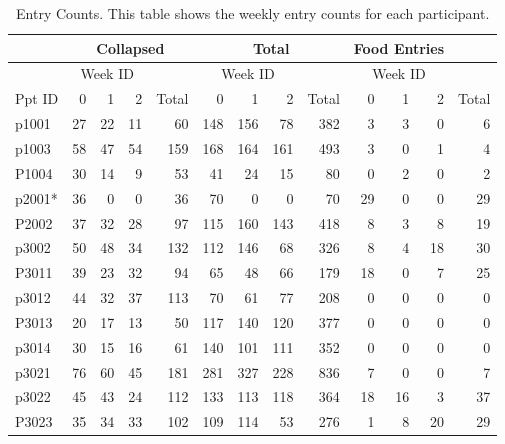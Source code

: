\begin{table}[htbp]
\small
  \centering
  \caption[Entry Counts. ]{Entry Counts. This table shows the weekly entry counts for each participant. }
    \begin{tabular}{lrrrrrrrrrrrr}
    \toprule
          & \multicolumn{4}{c}{Collapsed} & \multicolumn{4}{c}{Total}     & \multicolumn{3}{c}{Food Entries} &  \\
    \midrule
          & \multicolumn{3}{c}{Week ID} & \multicolumn{1}{c}{} & \multicolumn{3}{c}{Week ID} & \multicolumn{1}{c}{} & \multicolumn{3}{c}{Week ID} &  \\
    Ppt ID & 0     & 1     & 2     & Total & 0     & 1     & 2     & Total & 0     & 1     & 2     & Total \\
    p1001 & 27    & 22    & 11    & 60    & 148   & 156   & 78    & 382   & 3     & 3     & 0     & 6 \\
    p1003 & 58    & 47    & 54    & 159   & 168   & 164   & 161   & 493   & 3     & 0     & 1     & 4 \\
    P1004 & 30    & 14    & 9     & 53    & 41    & 24    & 15    & 80    & 0     & 2     & 0     & 2 \\
    p2001* & 36    & 0     & 0     & 36    & 70    & 0     & 0     & 70    & 29    & 0     & 0     & 29 \\
    P2002 & 37    & 32    & 28    & 97    & 115   & 160   & 143   & 418   & 8     & 3     & 8     & 19 \\
    p3002 & 50    & 48    & 34    & 132   & 112   & 146   & 68    & 326   & 8     & 4     & 18    & 30 \\
    P3011 & 39    & 23    & 32    & 94    & 65    & 48    & 66    & 179   & 18    & 0     & 7     & 25 \\
    p3012 & 44    & 32    & 37    & 113   & 70    & 61    & 77    & 208   & 0     & 0     & 0     & 0 \\
    P3013 & 20    & 17    & 13    & 50    & 117   & 140   & 120   & 377   & 0     & 0     & 0     & 0 \\
    p3014 & 30    & 15    & 16    & 61    & 140   & 101   & 111   & 352   & 0     & 0     & 0     & 0 \\
    p3021 & 76    & 60    & 45    & 181   & 281   & 327   & 228   & 836   & 7     & 0     & 0     & 7 \\
    p3022 & 45    & 43    & 24    & 112   & 133   & 113   & 118   & 364   & 18    & 16    & 3     & 37 \\
    P3023 & 35    & 34    & 33    & 102   & 109   & 114   & 53    & 276   & 1     & 8     & 20    & 29 \\

\end{tabular}
\end{table}
